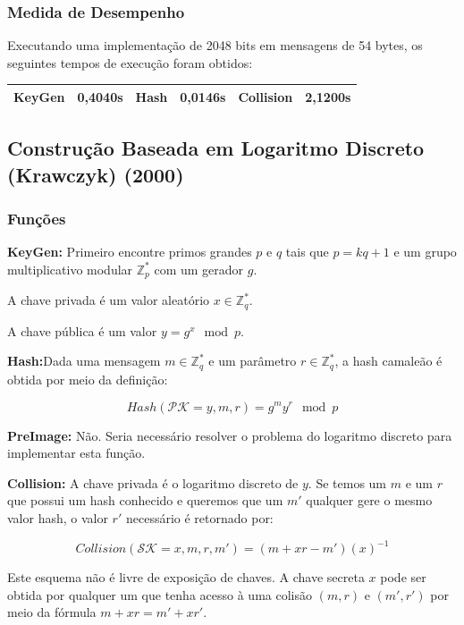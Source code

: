 \documentclass[a4paper]{article}
\begin{document}
\subsubsection{Medida de Desempenho}

Executando uma implementação de 2048 bits em mensagens de 54 bytes, os
seguintes tempos de execução foram obtidos:

\begin{center}
\begin{tabular}{|c|c|c|c|c|c|}
  \hline
  KeyGen & 0,4040s & Hash & 0,0146s & Collision & 2,1200s\\
  \hline
\end{tabular}
\end{center}

\subsection{Construção Baseada em Logaritmo Discreto (Krawczyk) (2000)
  \cite{krawczyk}}

\subsubsection{Funções}

\textbf{KeyGen: }Primeiro encontre primos grandes $p$ e $q$ tais que
$p = kq+1$ e um grupo multiplicativo modular $\mathbb{Z}^{*}_p$ com um
gerador $g$.

A chave privada é um valor aleatório $x \in \mathbb{Z}^{*}_q$.

A chave pública é um valor $y = g^x \mod p$.

\textbf{Hash:}Dada uma mensagem $m \in \mathbb{Z}^{*}_q$ e um
parâmetro $r\in \mathbb{Z}^{*}_q$, a hash camaleão é obtida por meio
da definição:

$$
Hash(\mathcal{PK}=y, m, r) = g^my^r \mod p
$$

\textbf{PreImage:} Não. Seria necessário resolver o problema do
logaritmo discreto para implementar esta função.

\textbf{Collision:} A chave privada é o logaritmo discreto de $y$. Se
temos um $m$ e um $r$ que possui um hash conhecido e queremos que um
$m'$ qualquer gere o mesmo valor hash, o valor $r'$ necessário é
retornado por:

$$
Collision(\mathcal{SK}=x, m, r, m') = (m+xr-m')(x)^{-1}
$$

Este esquema não é livre de exposição de chaves. A chave secreta $x$
pode ser obtida por qualquer um que tenha acesso à uma colisão $(m,
r)$ e $(m', r')$ por meio da fórmula $m+xr = m'+xr'$.
\end{document}
